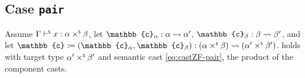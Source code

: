 \subsection{Case \texttt{pair}}

\begin{lemma}
\label{lem:loosening-pair}
Assume $\Gamma \vdash^{\scriptscriptstyle{\mathsf{S}}} x : \alpha \mathbin{\times^{\scriptscriptstyle{\mathsf{S}}}} \beta$, let $\mathbb{c}_\alpha : \castpath{\alpha}{\alpha'}$, $\mathbb{c}_\beta : \castpath{\beta}{\beta'}$, and let $\mathbb{c} \coloneq (\mathbb{c}_\alpha, \mathbb{c}_\beta) : \castpath{(\alpha \timesS \beta)}{(\alpha' \timesS \beta')}$.  holds with target type $\alpha' \mathbin{\times^{\scriptscriptstyle{\mathsf{S}}}} \beta'$ and semantic cast \eqref{eq:castZF-pair}, the product of the component casts.
\end{lemma}

